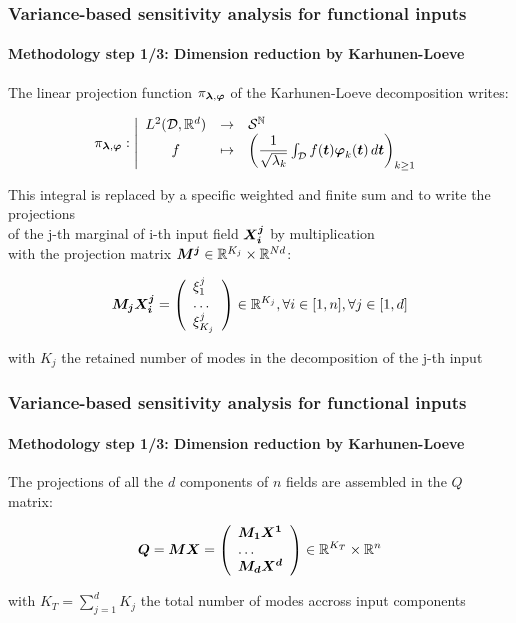 \documentclass[aspectratio=169]{beamer}
\begin{document}
\begin{frame}
\frametitle{Variance-based sensitivity analysis for functional inputs}

\framesubtitle{Methodology step 1/3: Dimension reduction by Karhunen-Loeve}

The linear projection function $\pi_{ {\mathbf{\boldsymbol{{\lambda}}}}, {\mathbf{\boldsymbol{{\varphi}}}}}$ of
the Karhunen-Loeve decomposition writes:

$$
    \pi_{{\mathbf{\boldsymbol{{\lambda}}}}, {\mathbf{\boldsymbol{{\varphi}}}}}: \left|
      \begin{array}{ccl}
        L^2({\mathcal D}, \mathbb{R}^d) & \rightarrow & {\mathcal S}^{{\mathbb N}} \\
        f & \mapsto &\left(\dfrac{1}{\sqrt{\lambda_k}}\int_{{\mathcal D}}f({\mathbf{\boldsymbol{{t}}}}) {\mathbf{\boldsymbol{{\varphi}}}}_k({\mathbf{\boldsymbol{{t}}}})\, d{\mathbf{\boldsymbol{{t}}}}\right)_{k \geq 1}
      \end{array}
    \right.
$$

This integral is replaced by a specific weighted and finite sum and to write the projections\\
of the j-th marginal of i-th input field ${\mathbf{\boldsymbol{{X_i^j}}}}$ by multiplication\\
with the projection matrix ${{\mathbf{\boldsymbol{{{\mathbf{\boldsymbol{{M^j}}}}}}}}} \in \mathbb{R}^{K_j} \times \mathbb{R}^{Nd}$:

$$
    {{\mathbf{\boldsymbol{{{\mathbf{\boldsymbol{{M_j}}}}}}}}} {\mathbf{\boldsymbol{{X_i^j}}}} = \left( \begin{array}{l} \xi_1^j \\ \dots \\ \xi_{K_j}^j \end{array} \right)
    \in \mathbb{R}^{K_j}, \forall i \in [1, n], \forall j \in [1, d]
$$

with $K_j$ the retained number of modes in the decomposition of the j-th input

\end{frame}

\begin{frame}
\frametitle{Variance-based sensitivity analysis for functional inputs}

\framesubtitle{Methodology step 1/3: Dimension reduction by Karhunen-Loeve}

The projections of all the $d$ components of $n$ fields are assembled in the $Q$ matrix:

$$
        {{\mathbf{\boldsymbol{{{\mathbf{\boldsymbol{{Q}}}}}}}}} = {{\mathbf{\boldsymbol{{{\mathbf{\boldsymbol{{M}}}}}}}}} {{\mathbf{\boldsymbol{{{\mathbf{\boldsymbol{{X}}}}}}}}} =
        \left(
          \begin{array}{l}
            {{\mathbf{\boldsymbol{{{\mathbf{\boldsymbol{{M_1}}}}}}}}} {{\mathbf{\boldsymbol{{{\mathbf{\boldsymbol{{X^1}}}}}}}}} \\
            \dots \\
            {{\mathbf{\boldsymbol{{{\mathbf{\boldsymbol{{M_d}}}}}}}}} {{\mathbf{\boldsymbol{{{\mathbf{\boldsymbol{{X^d}}}}}}}}}
          \end{array}
        \right) \in \mathbb{R}^{K_T} \times \mathbb{R}^n
$$

with $K_T = \sum_{j=1}^d{K_j}$ the total number of modes accross input components

\end{frame}
\end{document}
